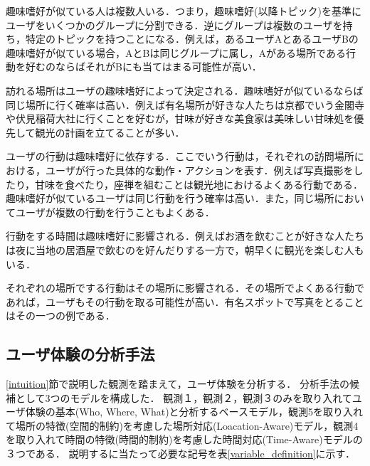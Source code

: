 \documentclass[a4j,10pt, twocolumn]{jarticle}
\begin{document}
\begin{description}
  \setlength{\leftskip}{.5cm}
  \item[\textbf{観測1}] 趣味嗜好が似ている人は複数人いる．つまり，趣味嗜好(以降トピック)を基準にユーザをいくつかのグループに分割できる．逆にグループは複数のユーザを持ち，特定のトピックを持つことになる．例えば，あるユーザAとあるユーザBの趣味嗜好が似ている場合，AとBは同じグループに属し，Aがある場所である行動を好むのならばそれがBにも当てはまる可能性が高い．
  \item[\textbf{観測2}] 訪れる場所はユーザの趣味嗜好によって決定される．趣味嗜好が似ているならば同じ場所に行く確率は高い．例えば有名場所が好きな人たちは京都でいう金閣寺や伏見稲荷大社に行くことを好むが，甘味が好きな美食家は美味しい甘味処を優先して観光の計画を立てることが多い．
  \item[\textbf{観測3}] ユーザの行動は趣味嗜好に依存する．ここでいう行動は，それぞれの訪問場所における，ユーザが行った具体的な動作・アクションを表す．例えば写真撮影をしたり，甘味を食べたり，座禅を組むことは観光地におけるよくある行動である．趣味嗜好が似ているユーザは同じ行動を行う確率は高い．また，同じ場所においてユーザが複数の行動を行うこともよくある．
  \item[\textbf{観測4}] 行動をする時間は趣味嗜好に影響される．例えばお酒を飲むことが好きな人たちは夜に当地の居酒屋で飲むのを好んだりする一方で，朝早くに観光を楽しむ人もいる．
  \item[\textbf{観測5}] それぞれの場所でする行動はその場所に影響される．その場所でよくある行動であれば，ユーザもその行動を取る可能性が高い．有名スポットで写真をとることはその一つの例である．
\end{description}
%
\subsection{ユーザ体験の分析手法} \label{model_definition}
\ref{intuition}節で説明した観測を踏まえて，ユーザ体験を分析する．
分析手法の候補として3つのモデルを構成した．
観測１，観測２，観測３のみを取り入れてユーザ体験の基本(Who, Where, What)と分析するベースモデル，観測5を取り入れて場所の特徴(空間的制約)を考慮した場所対応(Loacation-Aware)モデル，観測4を取り入れて時間の特徴(時間的制約)を考慮した時間対応(Time-Aware)モデルの３つである．
説明するに当たって必要な記号を表\ref{variable_definition}に示す．
\end{document}
